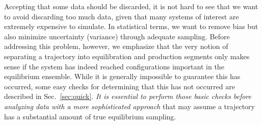 

Accepting that some data should be discarded, it is not hard to see that we want to avoid discarding too much data, given that many systems of interest are extremely expensive to simulate.  In statistical terms, we want to remove bias but also minimize uncertainty (variance) through adequate sampling.  Before addressing this problem, however, we emphasize that the very notion of separating a trajectory into equilibration and production segments only makes sense if the system has indeed reached configurations important in the equilibrium ensemble. While it is generally impossible to guarantee this has occurred, some easy checks for determining that this has not occurred are described in Sec.\ \ref{sec:quick}. \emph{It is essential to perform those basic checks before analyzing data with a more sophisticated approach} that may assume a trajectory has a substantial amount of true equilibrium sampling.

